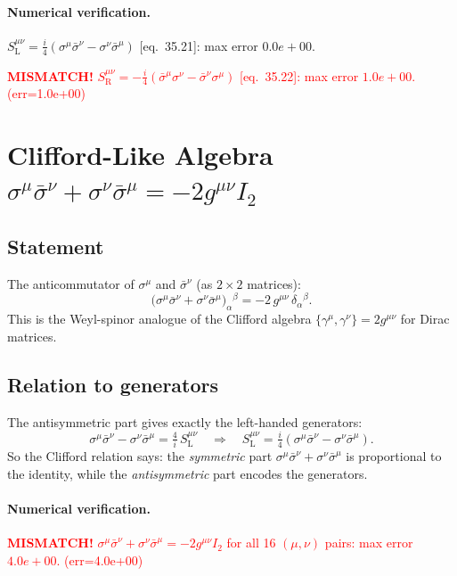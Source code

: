 \documentclass[12pt]{article}
\newcommand{\verified}[1]{\textcolor{verifygreen}{\checkmark\; #1}}
\begin{document}
\paragraph{Numerical verification.}
\verified{$S^{\mu\nu}_{\mathrm{L}} = \tfrac{i}{4}(\sigma^\mu\bar\sigma^\nu - \sigma^\nu\bar\sigma^\mu)$ [eq.~35.21]: max error $0.0e+00$.}

\textcolor{red}{\textbf{MISMATCH!} $S^{\mu\nu}_{\mathrm{R}} = -\tfrac{i}{4}(\bar\sigma^\mu\sigma^\nu - \bar\sigma^\nu\sigma^\mu)$ [eq.~35.22]: max error $1.0e+00$. (err=1.0e+00)}

\section{Clifford-Like Algebra \quad
         \texorpdfstring{$\sigma^\mu\bar\sigma^\nu + \sigma^\nu\bar\sigma^\mu
         = -2g^{\mu\nu}I_2$}{Clifford}}

\subsection{Statement}

The anticommutator of $\sigma^\mu$ and $\bar\sigma^\nu$ (as $2\times2$ matrices):
\begin{equation}
  \bigl(\sigma^\mu\bar\sigma^\nu + \sigma^\nu\bar\sigma^\mu\bigr)_\alpha{}^\beta
  = -2\,g^{\mu\nu}\,\delta_\alpha{}^\beta.
  \tag{35-Clifford}
\end{equation}
This is the Weyl-spinor analogue of the Clifford algebra
$\{\gamma^\mu,\gamma^\nu\} = 2g^{\mu\nu}$ for Dirac matrices.

\subsection{Relation to generators}

The antisymmetric part gives exactly the left-handed generators:
\[
  \sigma^\mu\bar\sigma^\nu - \sigma^\nu\bar\sigma^\mu
  = \tfrac{4}{i}\,S^{\mu\nu}_{\mathrm{L}}
  \quad\Longrightarrow\quad
  S^{\mu\nu}_{\mathrm{L}} = \tfrac{i}{4}
  (\sigma^\mu\bar\sigma^\nu - \sigma^\nu\bar\sigma^\mu).
\]
So the Clifford relation says: the \emph{symmetric} part
$\sigma^\mu\bar\sigma^\nu + \sigma^\nu\bar\sigma^\mu$ is proportional to
the identity, while the \emph{antisymmetric} part encodes the generators.

\paragraph{Numerical verification.}
\textcolor{red}{\textbf{MISMATCH!} $\sigma^\mu\bar\sigma^\nu + \sigma^\nu\bar\sigma^\mu = -2g^{\mu\nu}I_2$ for all 16 $(\mu,\nu)$ pairs: max error $4.0e+00$. (err=4.0e+00)}
\end{document}
